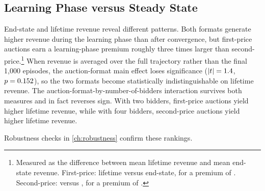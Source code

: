 \subsection{Learning Phase versus Steady State}

End-state and lifetime revenue reveal different patterns. Both formats generate higher revenue during the learning phase than after convergence, but first-price auctions earn a learning-phase premium roughly three times larger than second-price.\footnote{Measured as the difference between mean lifetime revenue and mean end-state revenue. First-price: \ExpOneBAllMeanFPA{} lifetime versus \ExpOneBEndMeanFPA{} end-state, for a premium of \ExpOneBFPAPremium. Second-price: \ExpOneBAllMeanSPA{} versus \ExpOneBEndMeanSPA, for a premium of \ExpOneBSPAPremium.} When revenue is averaged over the full trajectory rather than the final 1{,}000 episodes, the auction-format main effect loses significance ($|t| = 1.4$, $p = 0.152$), so the two formats become statistically indistinguishable on lifetime revenue. The auction-format-by-number-of-bidders interaction survives both measures and in fact reverses sign. With two bidders, first-price auctions yield higher lifetime revenue, while with four bidders, second-price auctions yield higher lifetime revenue.

Robustness checks in \cref{ch:robustness} confirm these rankings.
